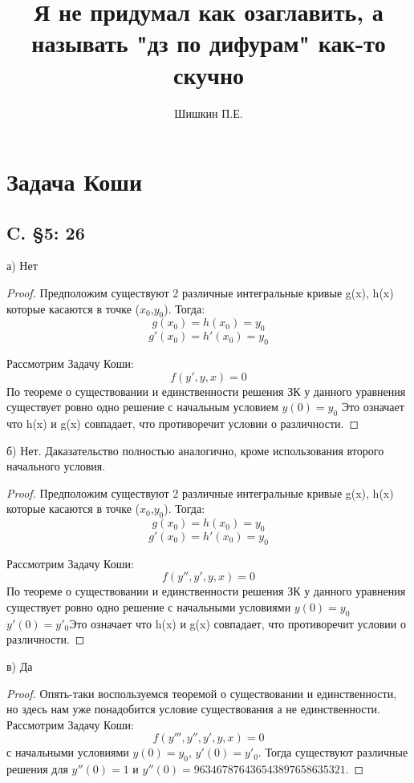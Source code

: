 \documentclass{article}
\title{Я не придумал как озаглавить, а называть "дз по дифурам" как-то скучно}
\author{Шишкин П.Е.}
\begin{document}
\maketitle
\tableofcontents

\section{Задача Коши}
\subsection{C. \S5: 26}

а) Нет 
\begin{proof} Предположим существуют 2 различные интегральные кривые g(x), h(x) которые касаются в точке ($x_0$,$y_0$). Тогда:
\begin{equation}
g(x_0)=h(x_0)=y_0
\end{equation}
\begin{equation}
g'(x_0)=h'(x_0)=y_0  
\end{equation}

Рассмотрим Задачу Коши:
\begin{equation}
f(y',y,x)=0
\end{equation}
По теореме о существовании и единственности решения ЗК у данного уравнения существует ровно одно решение с начальным условием $y(0)=y_0$ Это означает что h(x) и g(x) совпадает, что противоречит условии о различности. 
\end{proof}
б) Нет. Даказательство полностью аналогично, кроме использования второго начального условия.  
\begin{proof} Предположим существуют 2 различные интегральные кривые g(x), h(x) которые касаются в точке ($x_0$,$y_0$). Тогда:
\begin{equation}
g(x_0)=h(x_0)=y_0
\end{equation}
\begin{equation}
g'(x_0)=h'(x_0)=y_0  
\end{equation}

Рассмотрим Задачу Коши:
\begin{equation}
f(y'',y',y,x)=0
\end{equation}
По теореме о существовании и единственности решения ЗК у данного уравнения существует ровно одно решение с начальными условиями $y(0)=y_0$ $y'(0)=y'_0$Это означает что h(x) и g(x) совпадает, что противоречит условии о различности. 
\end{proof}
в) Да
\begin{proof}
Опять-таки воспользуемся теоремой о существовании и единственности, но здесь нам уже понадобится условие существования а не единственности.
Рассмотрим Задачу Коши:
\begin{equation}
f(y''',y'',y',y,x)=0 
\end{equation}
с начальными условиями $y(0)=y_0$, $y'(0)=y'_0$. Тогда существуют различные решения для $y''(0)=1$ и $y''(0)=963467876436543897658635321$. 
\end{proof}
\end{document}
